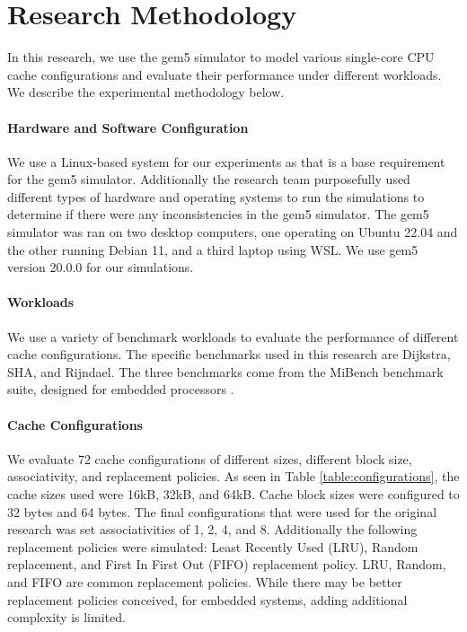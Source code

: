 \documentclass[conference]{IEEEtran}
\begin{document}
\section{Research Methodology}
In this research, we use the gem5 simulator to model various single-core CPU cache configurations and evaluate their performance under different workloads. We describe the experimental methodology below.

\paragraph{Hardware and Software Configuration}
We use a Linux-based system for our experiments as that is a base requirement for the gem5 simulator. Additionally the research team purposefully used different types of hardware and operating systems to run the simulations to determine if there were any inconsistencies in the gem5 simulator. The gem5 simulator was ran on two desktop computers, one operating on Ubuntu 22.04 and the other running Debian 11, and a third laptop using WSL. We use gem5 version 20.0.0 for our simulations.

\paragraph{Workloads}
We use a variety of benchmark workloads to evaluate the performance of different cache configurations. The specific benchmarks used in this research are Dijkstra, SHA, and Rijndael. The three benchmarks come from the MiBench benchmark suite, designed for embedded processors \cite{990739}.

\paragraph{Cache Configurations}
We evaluate 72 cache configurations of different sizes, different block size, associativity, and replacement policies. As seen in Table \ref{table:configurations}, the cache sizes used were 16kB, 32kB, and 64kB. Cache block sizes were configured to 32 bytes and 64 bytes. The final configurations that were used for the original research was set associativities of 1, 2, 4, and 8. Additionally the following replacement policies were simulated: Least Recently Used (LRU), Random replacement, and First In First Out (FIFO) replacement policy. LRU, Random, and FIFO are common replacement policies. While there may be better replacement policies conceived, for embedded systems, adding additional complexity is limited.
\end{document}
